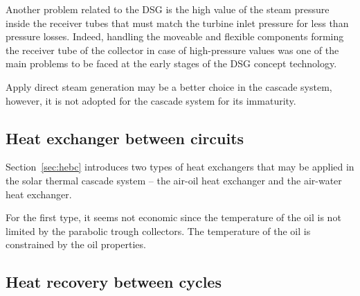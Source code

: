 Another problem related to the DSG is the high value of the steam pressure inside the receiver tubes that must match the turbine inlet pressure for less than pressure losses. Indeed, handling the moveable and flexible components forming the receiver tube of the collector in case of high-pressure values was one of the main problems to be faced at the early stages of the DSG concept technology. 

Apply direct steam generation may be a better choice in the cascade system, however, it is not adopted for the cascade system for its immaturity.

\subsection{Heat exchanger between circuits}

Section~\ref{sec:hebc} introduces two types of heat exchangers that may be applied in the solar thermal cascade system -- the air-oil heat exchanger and the air-water heat exchanger.

For the first type, it seems not economic since the temperature of the oil is not limited by the parabolic trough collectors. The temperature of the oil is constrained by the oil properties.  
\subsection{Heat recovery between cycles}